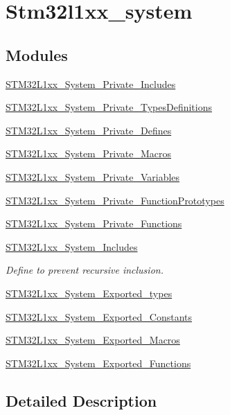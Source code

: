\hypertarget{group__stm32l1xx__system}{\section{Stm32l1xx\-\_\-system}
\label{group__stm32l1xx__system}
}
\subsection*{Modules}
\begin{DoxyCompactItemize}
\item 
\hyperlink{group___s_t_m32_l1xx___system___private___includes}{S\-T\-M32\-L1xx\-\_\-\-System\-\_\-\-Private\-\_\-\-Includes}
\item 
\hyperlink{group___s_t_m32_l1xx___system___private___types_definitions}{S\-T\-M32\-L1xx\-\_\-\-System\-\_\-\-Private\-\_\-\-Types\-Definitions}
\item 
\hyperlink{group___s_t_m32_l1xx___system___private___defines}{S\-T\-M32\-L1xx\-\_\-\-System\-\_\-\-Private\-\_\-\-Defines}
\item 
\hyperlink{group___s_t_m32_l1xx___system___private___macros}{S\-T\-M32\-L1xx\-\_\-\-System\-\_\-\-Private\-\_\-\-Macros}
\item 
\hyperlink{group___s_t_m32_l1xx___system___private___variables}{S\-T\-M32\-L1xx\-\_\-\-System\-\_\-\-Private\-\_\-\-Variables}
\item 
\hyperlink{group___s_t_m32_l1xx___system___private___function_prototypes}{S\-T\-M32\-L1xx\-\_\-\-System\-\_\-\-Private\-\_\-\-Function\-Prototypes}
\item 
\hyperlink{group___s_t_m32_l1xx___system___private___functions}{S\-T\-M32\-L1xx\-\_\-\-System\-\_\-\-Private\-\_\-\-Functions}
\item 
\hyperlink{group___s_t_m32_l1xx___system___includes}{S\-T\-M32\-L1xx\-\_\-\-System\-\_\-\-Includes}
\begin{DoxyCompactList}\small\item\em Define to prevent recursive inclusion. \end{DoxyCompactList}\item 
\hyperlink{group___s_t_m32_l1xx___system___exported__types}{S\-T\-M32\-L1xx\-\_\-\-System\-\_\-\-Exported\-\_\-types}
\item 
\hyperlink{group___s_t_m32_l1xx___system___exported___constants}{S\-T\-M32\-L1xx\-\_\-\-System\-\_\-\-Exported\-\_\-\-Constants}
\item 
\hyperlink{group___s_t_m32_l1xx___system___exported___macros}{S\-T\-M32\-L1xx\-\_\-\-System\-\_\-\-Exported\-\_\-\-Macros}
\item 
\hyperlink{group___s_t_m32_l1xx___system___exported___functions}{S\-T\-M32\-L1xx\-\_\-\-System\-\_\-\-Exported\-\_\-\-Functions}
\end{DoxyCompactItemize}


\subsection{Detailed Description}
